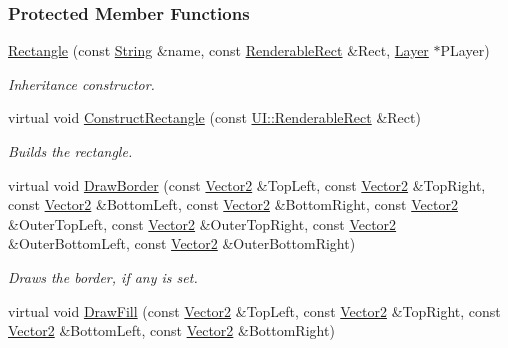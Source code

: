 \subsubsection*{Protected Member Functions}
\begin{DoxyCompactItemize}
\item 
\hyperlink{classMezzanine_1_1UI_1_1Rectangle_aa891d12c602dff942e8c00cfea078bd3}{Rectangle} (const \hyperlink{namespaceMezzanine_acf9fcc130e6ebf08e3d8491aebcf1c86}{String} \&name, const \hyperlink{structMezzanine_1_1UI_1_1RenderableRect}{RenderableRect} \&Rect, \hyperlink{classMezzanine_1_1UI_1_1Layer}{Layer} $\ast$PLayer)
\begin{DoxyCompactList}\small\item\em Inheritance constructor. \item\end{DoxyCompactList}\item 
\hypertarget{classMezzanine_1_1UI_1_1Rectangle_a902a27c0ac1f9b3b20f9134538aebd37}{
virtual void \hyperlink{classMezzanine_1_1UI_1_1Rectangle_a902a27c0ac1f9b3b20f9134538aebd37}{ConstructRectangle} (const \hyperlink{structMezzanine_1_1UI_1_1RenderableRect}{UI::RenderableRect} \&Rect)}
\label{classMezzanine_1_1UI_1_1Rectangle_a902a27c0ac1f9b3b20f9134538aebd37}

\begin{DoxyCompactList}\small\item\em Builds the rectangle. \item\end{DoxyCompactList}\item 
\hypertarget{classMezzanine_1_1UI_1_1Rectangle_a6ac9f21e25cee101b44bd79da9200c60}{
virtual void \hyperlink{classMezzanine_1_1UI_1_1Rectangle_a6ac9f21e25cee101b44bd79da9200c60}{DrawBorder} (const \hyperlink{classMezzanine_1_1Vector2}{Vector2} \&TopLeft, const \hyperlink{classMezzanine_1_1Vector2}{Vector2} \&TopRight, const \hyperlink{classMezzanine_1_1Vector2}{Vector2} \&BottomLeft, const \hyperlink{classMezzanine_1_1Vector2}{Vector2} \&BottomRight, const \hyperlink{classMezzanine_1_1Vector2}{Vector2} \&OuterTopLeft, const \hyperlink{classMezzanine_1_1Vector2}{Vector2} \&OuterTopRight, const \hyperlink{classMezzanine_1_1Vector2}{Vector2} \&OuterBottomLeft, const \hyperlink{classMezzanine_1_1Vector2}{Vector2} \&OuterBottomRight)}
\label{classMezzanine_1_1UI_1_1Rectangle_a6ac9f21e25cee101b44bd79da9200c60}

\begin{DoxyCompactList}\small\item\em Draws the border, if any is set. \item\end{DoxyCompactList}\item 
\hypertarget{classMezzanine_1_1UI_1_1Rectangle_ad6f23c178e4a3298ee99a90ed72f2296}{
virtual void \hyperlink{classMezzanine_1_1UI_1_1Rectangle_ad6f23c178e4a3298ee99a90ed72f2296}{DrawFill} (const \hyperlink{classMezzanine_1_1Vector2}{Vector2} \&TopLeft, const \hyperlink{classMezzanine_1_1Vector2}{Vector2} \&TopRight, const \hyperlink{classMezzanine_1_1Vector2}{Vector2} \&BottomLeft, const \hyperlink{classMezzanine_1_1Vector2}{Vector2} \&BottomRight)}
\label{classMezzanine_1_1UI_1_1Rectangle_ad6f23c178e4a3298ee99a90ed72f2296}


\end{DoxyCompactItemize}
